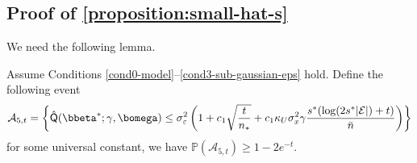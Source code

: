\documentclass[10pt]{article}
\numberwithin{equation}{section}
\begin{document}
\subsection{Proof of \cref{proposition:small-hat-s}}
\label{subsec:proof-small-hat-s}

We need the following lemma. 
\begin{lemma}
\label{lemma:lemma-qhat-beta-star}
    Assume Conditions \ref{cond0-model}--\ref{cond3-sub-gaussian-eps} hold. Define the following event
    \begin{align}
        \mathcal{A}_{5,t} = \left\{\hat{\mathsf{Q}}(\bbeta^*;\gamma,\bomega) \le \sigma_\varepsilon^2 \left( 1 + c_1 \sqrt{\frac{t}{n_*}} + c_1 \kappa_U\sigma_x^2 \gamma \frac{s^*( \log(2s^*|\mathcal{E}|) + t)}{\bar{n}}\right)\right\}
    \end{align} for some universal constant, we have $\mathbb{P}(\mathcal{A}_{5,t}) \ge 1-2e^{-t}$. 
\end{lemma}
\end{document}
